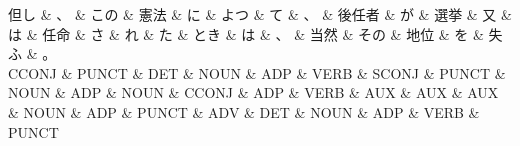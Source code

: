 \documentclass[tikz,border=5pt]{standalone}
\begin{document}
\normalsize
\begin{dependency}[edge unit distance=10.4pt]
    \begin{deptext}[column sep=1em]
        但し \& 、 \& この \& 憲法 \& に \& よつ \& て \& 、 \& 後任者 \& が \& 選挙 \& 又 \& は \& 任命 \& さ \& れ \& た \& とき \& は \& 、 \& 当然 \& その \& 地位 \& を \& 失ふ \& 。\\
        CCONJ \& PUNCT \& DET \& NOUN \& ADP \& VERB \& SCONJ \& PUNCT \& NOUN \& ADP \& NOUN \& CCONJ \& ADP \& VERB \& AUX \& AUX \& AUX \& NOUN \& ADP \& PUNCT \& ADV \& DET \& NOUN \& ADP \& VERB \& PUNCT\\
    \end{deptext}
\end{dependency}
\end{document}
